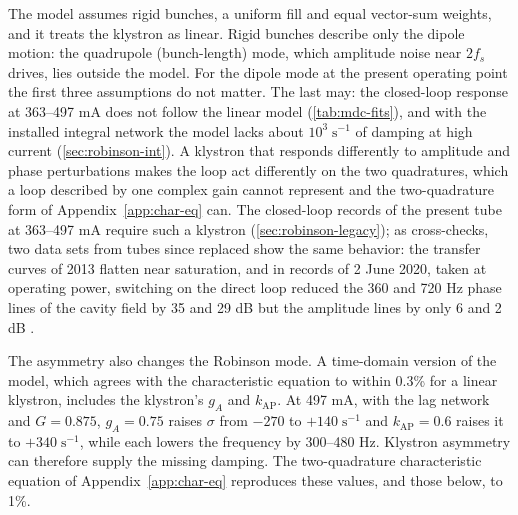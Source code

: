 The model assumes rigid bunches, a uniform fill and equal vector-sum weights, and it treats the klystron as linear. Rigid bunches describe only the dipole motion: the quadrupole (bunch-length) mode, which amplitude noise near \(2f_s\) drives, lies outside the model. For the dipole mode at the present operating point the first three assumptions do not matter. The last may: the closed-loop response at 363--497 mA does not follow the linear model (\cref{tab:mdc-fits}), and with the installed integral network the model lacks about \(10^3\;\text{s}^{-1}\) of damping at high current (\cref{sec:robinson-int}). A klystron that responds differently to amplitude and phase perturbations makes the loop act differently on the two quadratures, which a loop described by one complex gain cannot represent and the two-quadrature form of Appendix~\ref{app:char-eq} can. The closed-loop records of the present tube at 363--497 mA require such a klystron (\cref{sec:robinson-legacy}); as cross-checks, two data sets from tubes since replaced show the same behavior: the transfer curves of 2013 flatten near saturation, and in records of 2 June 2020, taken at operating power, switching on the direct loop reduced the 360 and 720 Hz phase lines of the cavity field by 35 and 29 dB but the amplitude lines by only 6 and 2 dB .

The asymmetry also changes the Robinson mode. A time-domain version of the model, which agrees with the characteristic equation to within 0.3\% for a linear klystron, includes the klystron's \(g_A\) and \(k_\text{AP}\). At 497 mA, with the lag network and \(G = 0.875\), \(g_A = 0.75\) raises \(\sigma\) from \(-270\) to \(+140\;\text{s}^{-1}\) and \(k_\text{AP} = 0.6\) raises it to \(+340\;\text{s}^{-1}\), while each lowers the frequency by 300--480 Hz. Klystron asymmetry can therefore supply the missing damping. The two-quadrature characteristic equation of Appendix~\ref{app:char-eq} reproduces these values, and those below, to 1\%.

